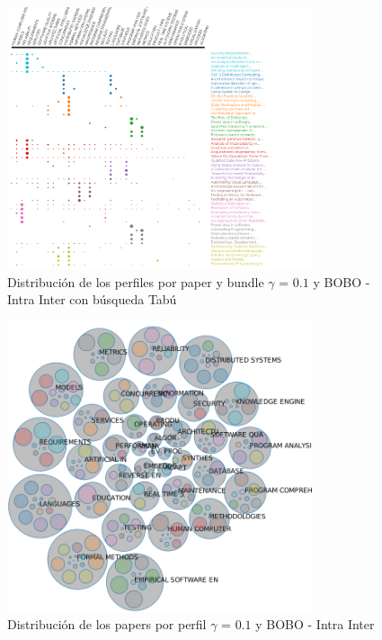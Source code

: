 \begin{figure}[H]
  \centering
    \includegraphics[width=0.8\textwidth]{resultados/papers/BOBO/INTRA_INTER/gamma-with-local-01.png}
  \caption{Distribución de los perfiles por paper y bundle $\gamma$ = $0.1$ y BOBO - Intra Inter con búsqueda Tabú}
  \label{res:img-papers-gamma01-bobo-intra-inter-tabu}
\end{figure}

\begin{figure}[H]
  \centering
    \includegraphics[width=0.8\textwidth]{resultados/papers/BOBO/INTRA_INTER/bubbles-gamma-01.png}
  \caption{Distribución de los papers por perfil $\gamma$ = $0.1$ y BOBO - Intra Inter}
  \label{res:img-papers-bubbles-gamma01-bobo-intra-inter}
\end{figure}

